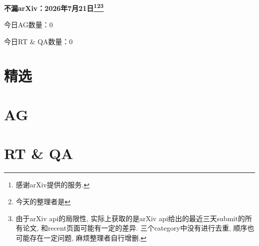 \documentclass[9pt, a4paper]{article}
\theoremstyle{plain}
\theoremstyle{definition}
\theoremstyle{remark}
\newcommand{\AGnumber}{0}
\newcommand{\RTQAnumber}{0}
\newcommand{\NewestDate}{2026年7月21日}
\newcommand{\todayarXiver}{} %
\begin{document}
\begin{center}
    \Huge\textbf{不漏arXiv：\NewestDate\footnote{感谢arXiv提供的服务.}\footnote{今天的整理者是\todayarXiver}\footnote{由于arXiv api的局限性, 实际上获取的是arXiv api给出的最近三天submit的所有论文, 和recent页面可能有一定的差异. 三个category中没有进行去重, 顺序也可能存在一定问题, 麻烦整理者自行增删.}} \\
\end{center}

\setcounter{section}{-1}

\begin{center}
    今日AG数量：\AGnumber
    
    今日RT \& QA数量：\RTQAnumber
    
\end{center}


\section{精选}


\section{AG}

\section{RT \& QA}
\end{document}
